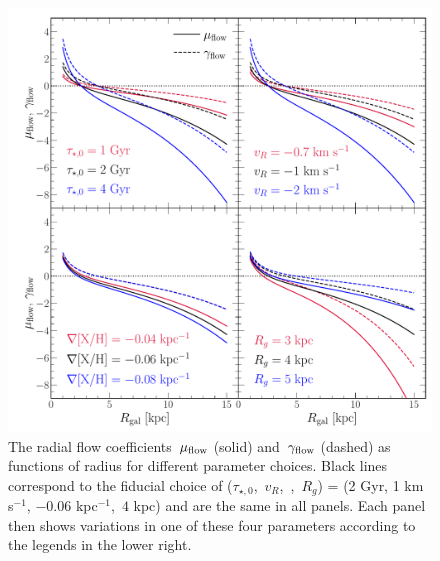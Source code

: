 \begin{figure}
\centering
\includegraphics[scale = 0.5]{chapter7/muflow_gammaflow_vs_radius.pdf}
\caption{
The radial flow coefficients~$\mu_{\text{flow}}$ (solid) and~$\gamma_{\text{flow}}$ (dashed) as
functions of radius for different parameter choices.
Black lines correspond to the fiducial choice of
($\tau_{\star,0}$,~$v_R$,~,~$R_g$) = (2 Gyr, 1 km s$^{-1}$,
$-0.06$ kpc$^{-1}$,~$4$ kpc) and are the same in all panels.
Each panel then shows variations in one of these four parameters according to
the legends in the lower right.
}
\label{outflows:fig:flow-coefficients-vs-radius}
\end{figure}

